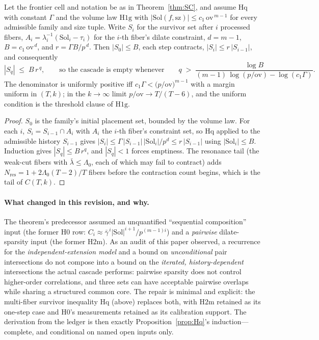 \begin{proposition}\label{prop:Hq}
Let the frontier cell and notation be as in Theorem~\ref{thm:SC}, and
assume $\mathrm{Hq}$ with constant $\Gamma$ and the volume law
$\mathrm{H1g}$ with $|\mathrm{Sol}(f,\mathrm{sz})|\le
c_1\,\mathrm{ov}^{\,m-1}$ for every admissible family and size tuple.
Write $S_i$ for the survivor set after $i$ processed fibers,
$A_i=\lambda_i^{-1}(\mathrm{Sol}_i-\tau_i)$ for the $i$-th fiber's
dilate constraint, $d=m-1$, $B=c_1\,\mathrm{ov}^{\,d}$, and
$r=\Gamma B/p^{\,d}$. Then $|S_0|\le B$, each step contracts,
$|S_i|\le r\,|S_{i-1}|$, and consequently
\[
|S_q|\;\le\;B\,r^{\,q},
\qquad\text{so the cascade is empty whenever}\qquad
q\;>\;\frac{\log B}{(m-1)\,\log(p/\mathrm{ov})-\log(c_1\Gamma)}.
\]
The denominator is uniformly positive iff
$c_1\Gamma<\bigl(p/\mathrm{ov}\bigr)^{m-1}$ with a margin uniform in
$(T,k)$; in the $k\to\infty$ limit $p/\mathrm{ov}\to T/(T-6)$, and the
uniform condition is the threshold clause of $\mathrm{H1g}$.
\end{proposition}

\begin{proof}
$S_0$ is the family's initial placement set, bounded by the volume law.
For each $i$, $S_i=S_{i-1}\cap A_i$ with $A_i$ the $i$-th fiber's
constraint set, so $\mathrm{Hq}$ applied to the admissible history
$S_{i-1}$ gives $|S_i|\le\Gamma\,|S_{i-1}|\,|\mathrm{Sol}_i|/p^{d}\le
r\,|S_{i-1}|$ using $|\mathrm{Sol}_i|\le B$. Induction gives
$|S_q|\le B\,r^{q}$, and $|S_q|<1$ forces emptiness. The resonance tail
(the weak-cut fibers with $\bar\lambda\le\Lambda_0$, each of which may
fail to contract) adds $N_{\mathrm{res}}=1+2\Lambda_0(T-2)/T$ fibers
before the contraction count begins, which is the tail of $C(T,k)$.
\end{proof}

\paragraph{What changed in this revision, and why.}
The theorem's predecessor assumed an unquantified ``sequential
composition'' input (the former $\mathrm{H0}$ row: $C_i\approx
\bar\gamma^{\,i}|\mathrm{Sol}|^{i+1}/p^{(m-1)i}$) and a \emph{pairwise}
dilate-sparsity input (the former $\mathrm{H2m}$). As an audit of this
paper observed, a recurrence for the \emph{independent-extension model}
and a bound on \emph{unconditional} pair intersections do not compose
into a bound on the \emph{iterated, history-dependent} intersections the
actual cascade performs: pairwise sparsity does not control
higher-order correlations, and three sets can have acceptable pairwise
overlaps while sharing a structured common core. The repair is minimal
and explicit: the multi-fiber survivor inequality $\mathrm{Hq}$ (above)
replaces both, with $\mathrm{H2m}$ retained as its one-step case and
$\mathrm{H0}$'s measurements retained as its calibration support. The
derivation from the ledger is then exactly
Proposition~\ref{prop:Hq}'s induction---complete, and conditional on
named open inputs only.

